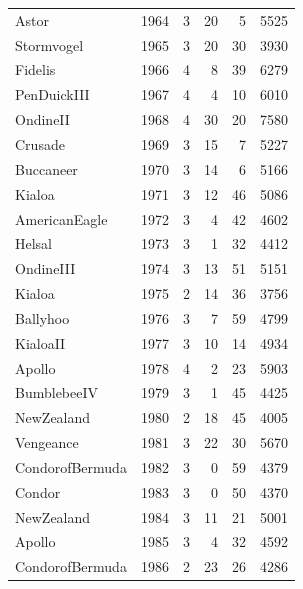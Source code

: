 \documentclass[11pt]{article}
\begin{document}
\begin{center}
\begin{tabular}{lrrrrr}
 Astor                &  1964  &     3  &     20  &        5  &    5525  \\
 Stormvogel           &  1965  &     3  &     20  &       30  &    3930  \\
 Fidelis              &  1966  &     4  &      8  &       39  &    6279  \\
 PenDuickIII          &  1967  &     4  &      4  &       10  &    6010  \\
 OndineII             &  1968  &     4  &     30  &       20  &    7580  \\
 Crusade              &  1969  &     3  &     15  &        7  &    5227  \\
 Buccaneer            &  1970  &     3  &     14  &        6  &    5166  \\
 Kialoa               &  1971  &     3  &     12  &       46  &    5086  \\
 AmericanEagle        &  1972  &     3  &      4  &       42  &    4602  \\
 Helsal               &  1973  &     3  &      1  &       32  &    4412  \\
 OndineIII            &  1974  &     3  &     13  &       51  &    5151  \\
 Kialoa               &  1975  &     2  &     14  &       36  &    3756  \\
 Ballyhoo             &  1976  &     3  &      7  &       59  &    4799  \\
 KialoaII             &  1977  &     3  &     10  &       14  &    4934  \\
 Apollo               &  1978  &     4  &      2  &       23  &    5903  \\
 BumblebeeIV          &  1979  &     3  &      1  &       45  &    4425  \\
 NewZealand           &  1980  &     2  &     18  &       45  &    4005  \\
 Vengeance            &  1981  &     3  &     22  &       30  &    5670  \\
 CondorofBermuda      &  1982  &     3  &      0  &       59  &    4379  \\
 Condor               &  1983  &     3  &      0  &       50  &    4370  \\
 NewZealand           &  1984  &     3  &     11  &       21  &    5001  \\
 Apollo               &  1985  &     3  &      4  &       32  &    4592  \\
 CondorofBermuda      &  1986  &     2  &     23  &       26  &    4286  \\

\end{tabular}
\end{center}
\end{document}
